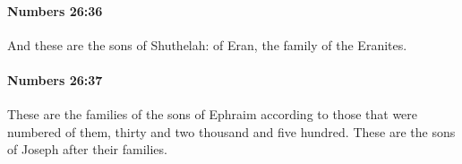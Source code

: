 		\paragraph{Numbers 26:36} %
			\label{NUMBERS-26-36}

			And these are the sons of Shuthelah: of Eran, the family of the Eranites.


		\paragraph{Numbers 26:37} %
			\label{NUMBERS-26-37}

			These are the families of the sons of Ephraim according to those that were numbered of them, thirty and two thousand and five hundred. These are the sons of Joseph after their families.


